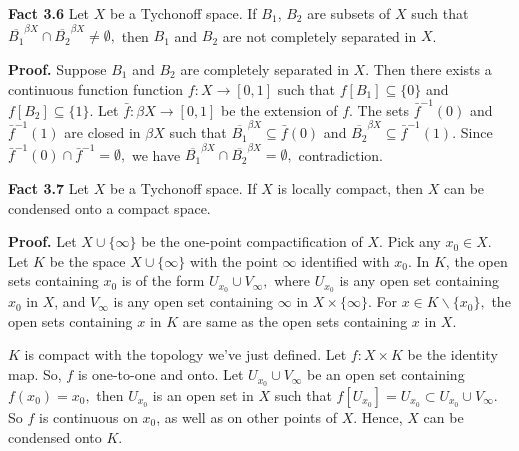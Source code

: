 \documentclass{article}
\begin{document}
\vskip 30pt



\textbf{Fact 3.6} Let $X$ be a Tychonoff space. If $B_1$, $B_2$ are subsets of $X$ such that $\overline{B_1}^{\beta X} \cap \overline{B_2}^{\beta X} \neq \emptyset,$ then $B_1$ and $B_2$ are not completely separated in $X$. 


\vskip 15pt


\textbf{Proof.} Suppose $B_1$ and $B_2$ are completely separated in $X$. Then there exists a continuous function function $f:X\rightarrow [0,1]$ such that 
$f\left[B_1\right] \subseteq\{0\}$ and $f\left[B_2\right]\subseteq \{1\}.$ Let $\bar{f}: \beta X\rightarrow [0,1]$ be the extension of $f$. The sets $\bar{f}^{-1}(0)$ and $\bar{f}^{-1}(1)$ are closed in $\beta X$ such that $\overline{B_1}^{\beta X} \subseteq \bar{f}(0)$ and $\overline{B_2}^{\beta X} \subseteq \bar{f}^{-1}(1).$ Since $\bar{f}^{-1}(0)\cap\bar{f}^{-1}=\emptyset,$ we have $\overline{B_1}^{\beta X}\cap \overline{B_2}^{\beta X}=\emptyset,$ contradiction. 


\vskip 30pt


\textbf{Fact 3.7} Let $X$ be a Tychonoff space. If $X$ is locally compact, then $X$ can be condensed onto a compact space. 

\vskip 15pt


\textbf{Proof.} Let $X\cup \{\infty\}$ be the one-point compactification of $X$. Pick any $x_0\in X$. Let $K$ be the space $X\cup \{\infty\}$ with the point $\infty$ identified with $x_0$. In $K$, the open sets containing $x_0$ is of the form $U_{x_0} \cup V_{\infty},$ where $U_{x_0}$ is any open set containing $x_0$ in $X$, and $V_\infty$ is any open set containing $\infty$ in $X\times \{\infty\}.$ For $x\in K\backslash \{x_0\},$ the open sets containing $x$ in $K$ are same as the open sets containing $x$ in $X$. 
\vskip 10pt

$K$ is compact with the topology we've just defined. Let $f:X\times K$ be the identity map. So, $f$ is one-to-one and onto. Let $U_{x_0}\cup V_\infty$ be an open set containing $f(x_0)=x_0,$ then $U_{x_0}$ is an open set in $X$ such that
$f\left[U_{x_0}\right]=U_{x_0}\subset U_{x_0}\cup V_\infty.$  So $f$ is continuous on $x_0$, as well as on other points of $X$. Hence, $X$ can be condensed onto $K$.
\end{document}
